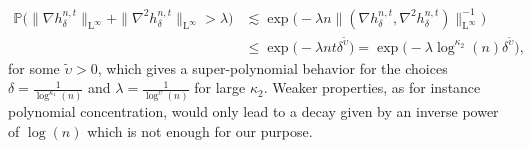 \documentclass[11pt,a4paper,oneside]{amsart}
\numberwithin{equation}{section}
\newcommand{\LL}{\mathrm{L}}
\begin{document}
%
\begin{align*}
%
\mathbb{P}\Big(\|\nabla h^{n,t}_\delta\|_{\LL^{\infty}}+\|\nabla^2 h^{n,t}_\delta\|_{\LL^\infty}>\lambda\Big)&\lesssim \exp\big(-\lambda n\|(\nabla h^{n,t}_\delta,\nabla^2 h^{n,t}_\delta)\|^{-1}_{\LL^{\infty}}\big)\\
&\leq \exp\big(-\lambda nt\delta^{\tilde{\upsilon}}\big)=\exp\big(-\lambda\log^{\kappa_2}(n)\delta^{\tilde{\upsilon}}\big),
%
\end{align*}
%
for some $\tilde{\upsilon}>0$, which gives a super-polynomial behavior for the choices $\delta=\frac{1}{\log^{\kappa_1}(n)}$ and $\lambda=\frac{1}{\log^{\upsilon}(n)}$ for large $\kappa_2$. Weaker properties, as for instance polynomial concentration, would only lead to a decay given by an inverse power of $\log(n)$ which is not enough for our purpose.
%
\medskip
%
\end{document}
